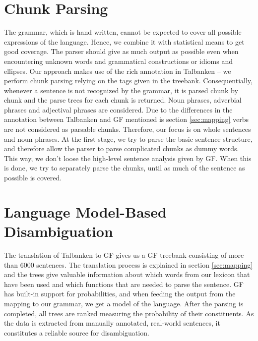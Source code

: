 \documentclass[runningheads,a4paper]{llncs}
\begin{document}
\section{Chunk Parsing}
\label{sec:chunk}
The grammar, which is hand written, cannot be expected to cover all
possible expressions of the language.
Hence, we combine it with statistical means to get good coverage. 
The parser should give as much output as possible 
even when encountering unknown words and grammatical constructions 
or idioms and ellipses.
Our approach makes use of the rich annotation in Talbanken -- we perform chunk parsing
relying on the tags given in the treebank. 
Consequentially, whenever a sentence is not recognized by the grammar, it is 
parsed chunk by chunk and the parse trees for each chunk is returned.
Noun phrases, adverbial phrases and adjectival phrases are considered.
Due to the differences in the annotation between Talbanken and
GF mentioned is section \ref{sec:mapping} verbs are not considered
as parsable chunks. %
Therefore, our focus is on whole sentences and noun phrases. At the first stage,
we try to parse the basic sentence structure, and therefore allow the parser
to parse complicated chunks as dummy words. This way, we don't loose the 
high-level sentence analysis given by GF.
When this is done, we try to separately parse the chunks,
until as much of the sentence as possible is covered. 



\section{Language Model-Based Disambiguation}

The translation of Talbanken to GF gives us a GF treebank consisting of more than
6000 sentences. The translation process is explained in section
\ref{sec:mapping} and the trees give valuable 
information about which words from our lexicon that have been used
and which functions that are needed to parse the sentence.
GF has built-in support for probabilities, and when feeding the output
from the mapping to our grammar, we get a model of the language. 
After the parsing is completed, all trees are ranked measuring the
probability of their constituents.
As the data is extracted from manually annotated, real-world sentences,
it constitutes a reliable source for disambiguation.
\end{document}
